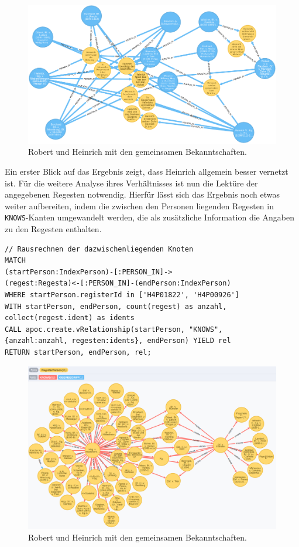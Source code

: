 \documentclass[ngerman,]{scrreprt}
\begin{document}
\begin{figure}
\centering
\includegraphics{Bilder/RI2Graph/RobertundHeinrichMitBrokern.png}
\caption{Robert und Heinrich mit den gemeinsamen Bekanntschaften.}
\end{figure}

Ein erster Blick auf das Ergebnis zeigt, dass Heinrich allgemein besser vernetzt ist. Für die weitere Analyse ihres Verhältnisses ist nun die Lektüre der angegebenen Regesten notwendig. Hierfür lässt sich das Ergebnis noch etwas weiter aufbereiten, indem die zwischen den Personen liegenden Regesten in \texttt{KNOWS}-Kanten umgewandelt werden, die als zusätzliche Information die Angaben zu den Regesten enthalten.

\begin{verbatim}
// Rausrechnen der dazwischenliegenden Knoten
MATCH
(startPerson:IndexPerson)-[:PERSON_IN]->
(regest:Regesta)<-[:PERSON_IN]-(endPerson:IndexPerson)
WHERE startPerson.registerId in ['H4P01822', 'H4P00926']
WITH startPerson, endPerson, count(regest) as anzahl,
collect(regest.ident) as idents
CALL apoc.create.vRelationship(startPerson, "KNOWS",
{anzahl:anzahl, regesten:idents}, endPerson) YIELD rel
RETURN startPerson, endPerson, rel;
\end{verbatim}

\begin{figure}
\centering
\includegraphics{Bilder/RI2Graph/RobertUndHeinrichApoc.png}
\caption{Robert und Heinrich mit den gemeinsamen Bekanntschaften.}
\end{figure}
\end{document}
